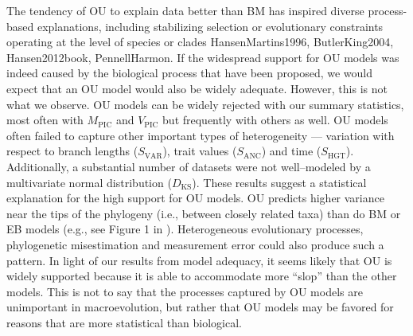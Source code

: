 \documentclass[a4paper,12pt]{article}
\begin{document}
The tendency of OU to explain data better than BM has inspired diverse process-based explanations, including stabilizing selection or evolutionary constraints operating at the level of species or clades {HansenMartins1996, ButlerKing2004, Hansen2012book, PennellHarmon}. 
If the widespread support for OU models was indeed caused by the biological process that have been proposed, we would expect that an OU model would also be widely adequate. However, this is not what we observe. OU models can be widely rejected with our summary statistics, most often with $M_{\text{PIC}}$ and $V_{\text{PIC}}$ but frequently with others as well. OU models often failed to capture other important types of heterogeneity --- variation with respect to branch lengths ($S_{\text{VAR}}$), trait values ($S_{\text{ANC}}$) and time ($S_{\text{HGT}}$). Additionally, a substantial number of datasets were not well--modeled by a multivariate normal distribution ($D_{\text{KS}}$). These results suggest a statistical explanation for the high support for OU models. OU predicts higher variance near the tips of the phylogeny (i.e., between closely related taxa) than do BM or EB models (e.g., see Figure 1 in \citep{Harmon2010}). Heterogeneous evolutionary processes, phylogenetic misestimation and measurement error \citep{Houle2011, Hansen2012} could also produce such a pattern. In light of our results from model adequacy, it seems likely that OU is widely supported because it is able to accommodate more ``slop'' than the other models.  This is not to say that the processes captured by OU models are unimportant in macroevolution, but rather that OU models may be favored for reasons that are more statistical than biological.
\end{document}
